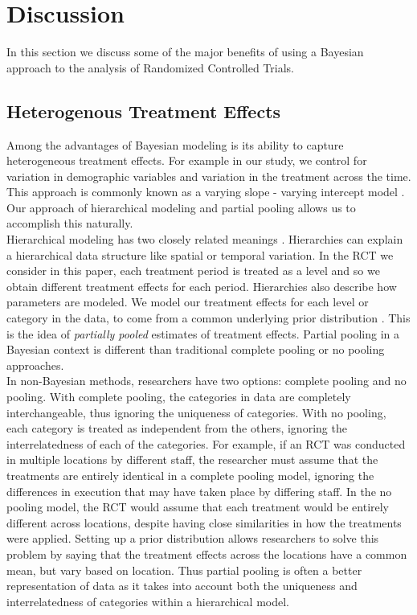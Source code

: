 \documentclass{article}
\begin{document}
%
%

\section*{Discussion}
In this section we discuss some of the major benefits of using a Bayesian approach to the analysis of Randomized Controlled Trials.

\subsection*{Heterogenous Treatment Effects}
Among the advantages of Bayesian modeling is its ability to capture heterogeneous treatment effects. For example in our study, we control for variation in demographic variables and variation in the treatment across the time. This approach is commonly known as a varying slope - varying intercept model \cite{gelman2006data}. Our approach of hierarchical modeling and partial pooling \cite{gelman2014bayesian} allows us to accomplish this naturally. \\
Hierarchical modeling has two closely related meanings \cite{feller2015hierarchical}. Hierarchies can explain a hierarchical data structure like spatial or temporal variation. In the RCT we consider in this paper, each treatment period is treated as a level and so we obtain different treatment effects for each period. Hierarchies also describe how parameters are modeled. We model our treatment effects for each level or category in the data, to come from a common underlying prior distribution \cite{gelman2014bayesian}. This is the idea of \textit{partially pooled} estimates of treatment effects. Partial pooling in a Bayesian context is different than traditional complete pooling or no pooling approaches. \\
In non-Bayesian methods, researchers have two options: complete pooling and no pooling. With complete pooling, the categories in data are completely interchangeable, thus ignoring the uniqueness of categories. With no pooling, each category is treated as independent from the others, ignoring the interrelatedness of each of the categories.  For example, if an RCT was conducted in multiple locations by different staff, the researcher must assume that the treatments are entirely identical in a complete pooling model, ignoring the differences in execution that may have taken place by differing staff. In the no pooling model, the RCT would assume that each treatment would be entirely different across locations, despite having close similarities in how the treatments were applied. Setting up a prior distribution allows researchers to solve this problem by saying that the treatment effects across the locations have a common mean, but vary based on location. Thus partial pooling is often a better representation of data as it takes into account both the uniqueness and interrelatedness of categories within a hierarchical model.
\end{document}
